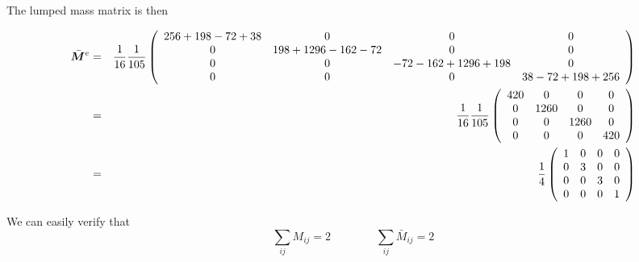 The lumped mass matrix is then
\begin{small}
\begin{eqnarray}
\bar{\bm M}^e 
&=&
\frac{1}{16}\frac{1}{105}
\left(
\begin{array}{cccc}
256 + 198 -72  +38 & 0 & 0 & 0  \\
0 & 198 + 1296  -162 -72 & 0 & 0\\
0 & 0 & -72 -162 + 1296 + 198 & 0\\
0 & 0 & 0 & 38 -72 + 198 + 256
\end{array}
\right) \nonumber\\
&=&
\frac{1}{16}\frac{1}{105}
\left(
\begin{array}{cccc}
420 & 0 & 0 & 0  \\
0 & 1260 & 0 & 0\\
0 & 0 & 1260 & 0\\
0 & 0 & 0 & 420
\end{array}
\right) \nonumber\\
&=&
\frac{1}{4}
\left(
\begin{array}{cccc}
1 & 0 & 0 & 0  \\
0 & 3 & 0 & 0\\
0 & 0 & 3 & 0\\
0 & 0 & 0 & 1
\end{array}
\right) \nonumber
\end{eqnarray}
\end{small}
We can easily verify that
\[
\sum_{ij} M_{ij} = 2
\qquad
\qquad
\sum_{ij} \bar{M}_{ij} = 2
\]


